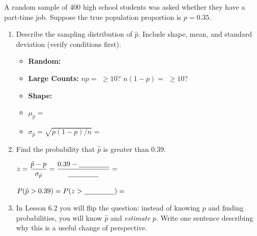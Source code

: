 \documentclass[10pt]{article}
\begin{document}
\namedateperiod

\vspace{0.15in}

A random sample of 400 high school students was asked whether they have a part-time
job. Suppose the true population proportion is $p = 0.35$.

\begin{enumerate}
  \item Describe the sampling distribution of $\hat p$. Include shape, mean, and standard
        deviation (verify conditions first).

        \begin{itemize}
          \item \textbf{Random:} \blank{6cm}
          \item \textbf{Large Counts:} $np = $ \blank{2.5cm} $\ge 10$? \blank{1cm} \quad $n(1-p) = $ \blank{2.5cm} $\ge 10$? \blank{1cm}
          \item \textbf{Shape:} \blank{6cm}
          \item $\mu_{\hat p} = $ \blank{3cm}
          \item $\sigma_{\hat p} = \sqrt{p(1-p)/n} = $ \blank{5cm}
        \end{itemize}

  \item Find the probability that $\hat p$ is greater than 0.39.
        \vspace{0.05in}

        $z = \dfrac{\hat p - p}{\sigma_{\hat p}} = \dfrac{0.39 - \blank{1.5cm}}{\blank{1.5cm}} = $ \blank{2cm}

        \vspace{0.05in}
        $P(\hat p > 0.39) = P(z > \blank{1.5cm}) = $ \blank{2.5cm}

  \item In Lesson 6.2 you will flip the question: instead of knowing $p$ and finding
        probabilities, you will know $\hat p$ and \emph{estimate} $p$. Write one sentence
        describing why this is a useful change of perspective.

\end{enumerate}
\end{document}
